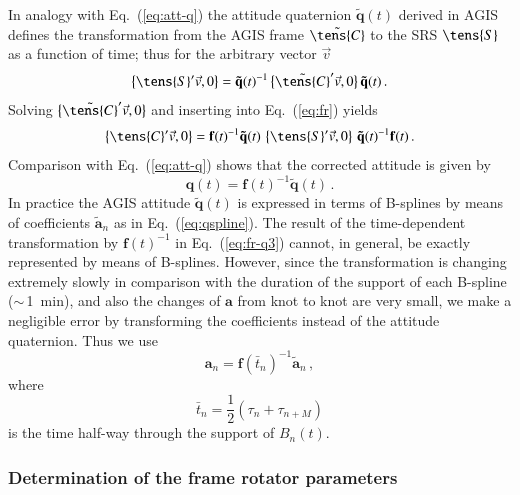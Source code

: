 \documentclass[structabstract]{aa}
\newcommand{\quat}[1]{\mathbf{#1}}
\begin{document}
In analogy with Eq.~(\ref{eq:att-q}) the attitude quaternion $\quat{\tilde{q}}(t)$ 
derived in AGIS defines the transformation from the AGIS frame 
$\tilde{\tens{C}}$ to the SRS $\tens{S}$ as a function of time; thus for the
arbitrary vector $\vec{v}$
\begin{equation}\label{eq:fr-q1}
\left\{ \tens{S}'\vec{v}, 0 \right\} = \quat{\tilde{q}}(t)^{-1}
\,\big\{ \tilde{\tens{C}}'\vec{v}, 0 \big\}\, \quat{\tilde{q}}(t) \, .
\end{equation}
Solving $\big\{ \tilde{\tens{C}}'\vec{v}, 0 \big\}$ and inserting into
Eq.~(\ref{eq:fr}) yields
\begin{equation}\label{eq:fr-q2}
\left\{ \tens{C}'\vec{v}, 0 \right\} = \quat{f}(t)^{-1}\quat{\tilde{q}}(t)
\,\left\{ \tens{S}'\vec{v}, 0 \right\}\,\quat{\tilde{q}}(t)^{-1}\quat{f}(t) \, .
\end{equation}
Comparison with Eq.~(\ref{eq:att-q}) shows that the corrected attitude
is given by
\begin{equation}\label{eq:fr-q3}
\quat{q}(t) = \quat{f}(t)^{-1}\quat{\tilde{q}}(t) \, .
\end{equation} 
In practice the AGIS attitude $\quat{\tilde{q}}(t)$ is expressed in terms
of B-splines by means of coefficients $\quat{\tilde{a}}_n$ as in
Eq.~(\ref{eq:qspline}). The result of the time-dependent transformation 
by $\quat{f}(t)^{-1}$ in Eq.~(\ref{eq:fr-q3}) cannot, in general, be exactly 
represented by means of B-splines. However, since the transformation is 
changing extremely slowly in comparison with the duration of the support
of each B-spline ($\sim\,$1~min), 
and also the changes of $\quat{a}$ from knot to knot are very small,
we make a negligible error by 
transforming the coefficients instead of the attitude quaternion. Thus
we use
\begin{equation}\label{eq:fr-q4}
\quat{a}_n = \quat{f}(\bar{t}_n)^{-1}\quat{\tilde{a}}_n \, ,
\end{equation} 
where
\begin{equation}\label{eq:RF4}
\bar{t}_n = \frac{1}{2}(\tau_n + \tau_{n+M})
\end{equation}
is the time half-way through the support of $B_n(t)$.


\subsubsection{Determination of the frame rotator parameters}\label{sec:framedet}
\end{document}
